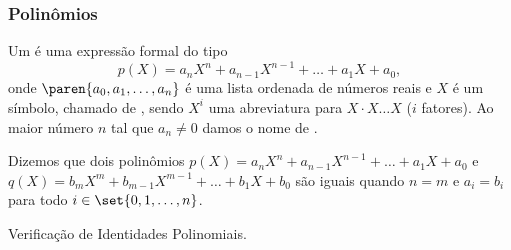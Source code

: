 \subsubsection{Polinômios}

\begin{definition}[Polinômio]
Um  é uma expressão formal do tipo
$$p(X) = a_n X^n+ a_{n-1} X^{n-1} + \dots + a_1X + a_0,$$
onde $\paren{a_0, a_1 , \dots , a_n}$ é uma lista ordenada de
números reais e $X$ é um símbolo, chamado de ,
sendo $X^i$ uma abreviatura para $X\cdot X  \dots  X$ ($i$ fatores).
Ao maior número $n$ tal que $a_n \neq 0$ damos o nome de .
\end{definition}

\begin{definition}
Dizemos que dois polinômios $p(X) = a_n X^n+ a_{n-1} X^{n-1} + \dots
+ a_1X + a_0$ e $q(X) = b_m X^m + b_{m-1} X^{m-1} + \dots + b_1X +
b_0$ são iguais quando $n=m$ e $a_i = b_i$ para todo $i \in \set{0,
1, \dots , n}$.
\end{definition}

\begin{onlineact}
    {Verificação de Identidades Polinomiais}.
\end{onlineact}